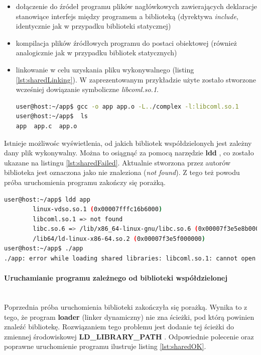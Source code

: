 \begin{itemize}
\item dołączenie do źródeł programu plików nagłówkowych zawierających deklaracje stanowiące interfejs między programem a biblioteką (dyrektywa \textit{include}, identycznie jak w przypadku biblioteki statycznej)

\item kompilacja plików źródłowych programu do postaci obiektowej (również analogicznie jak w przypadku bibliotek statycznych)

\item linkowanie w celu uzyskania pliku wykonywalnego (listing \ref{lst:sharedLinking}). W zaprezentowanym przykładzie użyte zostało stworzone wcześniej dowiązanie symboliczne \textit{libcoml.so.1}.

\begin{lstlisting}[language=bash, style=Cmd, caption={Linkowanie w celu uzyskania pliku wykonywalnego zależnego od biblioteki współdzielonej}, label={lst:sharedLinking}]
user@host:~/app$ gcc -o app app.o -L../complex -l:libcoml.so.1
user@host:~/app$  ls
app  app.c  app.o
\end{lstlisting}

\end{itemize}

Istnieje możliwośc wyświetlenia, od jakich bibliotek współdzielonych jest zależny dany plik wykonywalny. Można to osiągnąć za pomocą narzędzie \textbf{ldd} \cite{shared2}, co zostało ukazane na listingu \ref{lst:sharedFailed}. Aktualnie stworzona przez autorów biblioteka jest oznaczona jako nie znaleziona (\textit{not found}). Z tego też powodu próba uruchomienia programu zakończy się porażką. 

\begin{lstlisting}[language=bash, style=Cmd, caption={Użycie polecenia \textit{ldd} i pierwsza, nieudana próba uruchomienia aplikacji zależnej od biblioteki współdzielonej}, label={lst:sharedFailed}]
user@host:~/app$ ldd app
        linux-vdso.so.1 (0x00007fffc16b6000)
        libcoml.so.1 => not found
        libc.so.6 => /lib/x86_64-linux-gnu/libc.so.6 (0x00007f3e5e8b0000)
        /lib64/ld-linux-x86-64.so.2 (0x00007f3e5f000000)
user@host:~/app$ ./app
./app: error while loading shared libraries: libcoml.so.1: cannot open shared object file: No such file or directory
\end{lstlisting}

\paragraph*{Uruchamianie programu zależnego od biblioteki współdzielonej}\mbox{}\\
Poprzednia próba uruchomienia biblioteki zakończyła się porażką. Wynika to z tego, że program \textbf{loader} (linker dynamiczny) nie zna ścieżki, pod którą powinien znaleźć bibliotekę. Rozwiązaniem tego problemu jest dodanie tej ścieżki do zmiennej środowiskowej \textbf{LD\_LIBRARY\_PATH} \cite{shared3}. Odpowiednie polecenie oraz poprawne uruchomienie programu ilustruje listing \ref{lst:sharedOK}.

